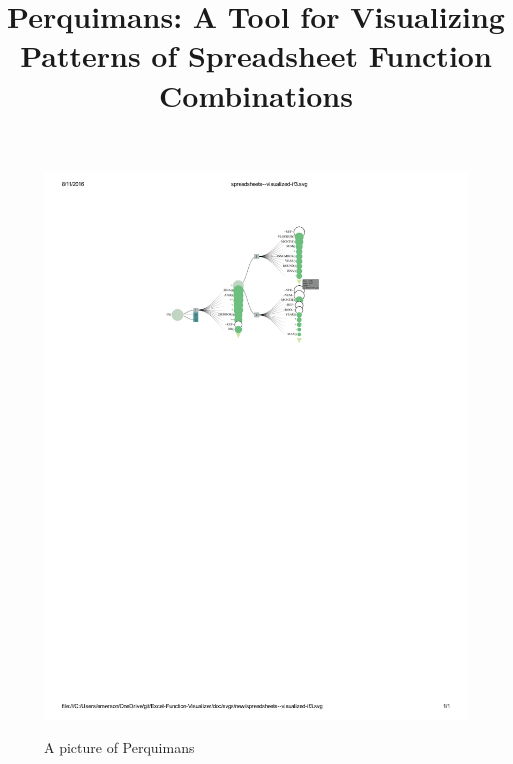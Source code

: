 \documentclass[conference]{IEEEtran}
\newcommand{\toolname}{Perquimans }
\newcommand{\toolnameend}{Perquimans}
\begin{document}
	\title{\toolnameend: A Tool for Visualizing Patterns of Spreadsheet Function Combinations}
	
	
	\author{ 
		}
	
	
	\maketitle
	
	\begin{figure}[t] \includegraphics[width = \textwidth]{IFargslabel} \caption{A
			picture of \toolname} \centering \label{fig:fullpic} \end{figure}
	
\end{document}
